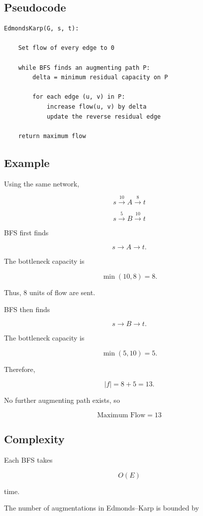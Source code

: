 \documentclass[12pt,a4paper]{article}
\begin{document}
\subsection{Pseudocode}

\begin{lstlisting}
EdmondsKarp(G, s, t):

    Set flow of every edge to 0

    while BFS finds an augmenting path P:
        delta = minimum residual capacity on P

        for each edge (u, v) in P:
            increase flow(u, v) by delta
            update the reverse residual edge

    return maximum flow
\end{lstlisting}

\subsection{Example}

Using the same network,

\[
s \xrightarrow{10} A \xrightarrow{8} t
\]

\[
s \xrightarrow{5} B \xrightarrow{10} t
\]

BFS first finds

\[
s \rightarrow A \rightarrow t.
\]

The bottleneck capacity is

\[
\min(10,8)=8.
\]

Thus, 8 units of flow are sent.

BFS then finds

\[
s \rightarrow B \rightarrow t.
\]

The bottleneck capacity is

\[
\min(5,10)=5.
\]

Therefore,

\[
|f|=8+5=13.
\]

No further augmenting path exists, so

\[
\boxed{\text{Maximum Flow}=13}
\]

\subsection{Complexity}

Each BFS takes

\[
O(E)
\]

time.

The number of augmentations in Edmonds--Karp is bounded by
\end{document}
